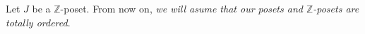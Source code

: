 Let $J$ be a $\mathbb{Z}$-poset. From now on, \textit{we will asume that our posets and $\mathbb{Z}$-posets are totally ordered}. \\
%

